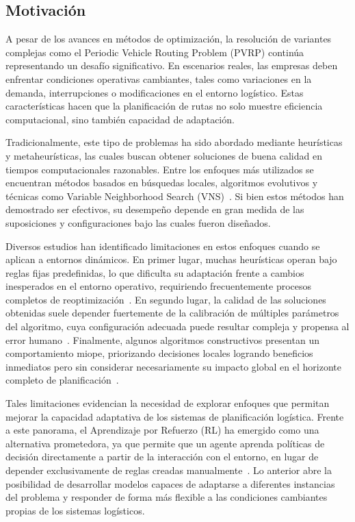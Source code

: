 \subsection{Motivación} \label{sec:Motivacion}
A pesar de los avances en métodos de optimización, la resolución de variantes complejas como el Periodic Vehicle Routing Problem (PVRP) continúa representando un desafío significativo. En escenarios reales, las empresas deben enfrentar condiciones operativas cambiantes, tales como variaciones en la demanda, interrupciones o modificaciones en el entorno logístico. Estas características hacen que la planificación de rutas no solo muestre eficiencia computacional, sino también capacidad de adaptación.

Tradicionalmente, este tipo de problemas ha sido abordado mediante heurísticas y metaheurísticas, las cuales buscan obtener soluciones de buena calidad en tiempos computacionales razonables. Entre los enfoques más utilizados se encuentran métodos basados en búsquedas locales, algoritmos evolutivos y técnicas como Variable Neighborhood Search (VNS)~\cite{HEMMELMAYR2009791}. Si bien estos métodos han demostrado ser efectivos, su desempeño depende en gran medida de las suposiciones y configuraciones bajo las cuales fueron diseñados.

Diversos estudios han identificado limitaciones en estos enfoques cuando se aplican a entornos dinámicos. En primer lugar, muchas heurísticas operan bajo reglas fijas predefinidas, lo que dificulta su adaptación frente a cambios inesperados en el entorno operativo, requiriendo frecuentemente procesos completos de reoptimización~\cite{nazari2018reinforcementlearningsolvingvehicle}. En segundo lugar, la calidad de las soluciones obtenidas suele depender fuertemente de la calibración de múltiples parámetros del algoritmo, cuya configuración adecuada puede resultar compleja y propensa al error humano~\cite{Chen,inproceedings}. Finalmente, algunos algoritmos constructivos presentan un comportamiento miope, priorizando decisiones locales logrando beneficios inmediatos pero sin considerar necesariamente su impacto global en el horizonte completo de planificación~\cite{inbook}.

Tales limitaciones evidencian la necesidad de explorar enfoques que permitan mejorar la capacidad adaptativa de los sistemas de planificación logística. Frente a este panorama, el Aprendizaje por Refuerzo (RL) ha emergido como una alternativa prometedora, ya que permite que un agente aprenda políticas de decisión directamente a partir de la interacción con el entorno, en lugar de depender exclusivamente de reglas creadas manualmente~\cite{SuttonBarto2014}. Lo anterior abre la posibilidad de desarrollar modelos capaces de adaptarse a diferentes instancias del problema y responder de forma más flexible a las condiciones cambiantes propias de los sistemas logísticos.

